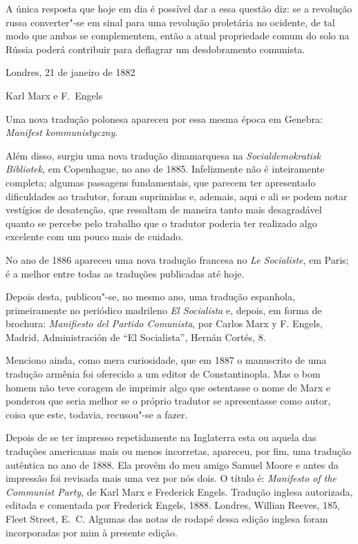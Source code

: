 \begin{hedraquote}
 A única resposta que hoje em dia é possível dar a essa questão diz: se
a revolução russa converter"-se em sinal para uma revolução proletária
no ocidente, de tal modo que ambas se complementem, então a atual
propriedade comum do solo na Rússia poderá contribuir para deflagrar um
desdobramento comunista. 

\hfill Londres, 21 de janeiro de 1882

\hfill Karl Marx e F.~Engels
\end{hedraquote} 

 Uma nova tradução polonesa apareceu por essa mesma época em Genebra:
\textit{Manifest kommunistyczny}.

 Além disso, surgiu uma nova tradução dinamarquesa na
\textit{Socialdemokratisk Bibliotek}, em Copenhague, no ano de 1885.
Infelizmente não é inteiramente completa; algumas passagens
fundamentais, que parecem ter apresentado dificuldades ao tradutor,
foram suprimidas e, ademais, aqui e ali se podem notar vestígios de
desatenção, que ressaltam de maneira tanto mais desagradável quanto se
percebe pelo trabalho que o tradutor poderia ter realizado algo
excelente com um pouco mais de cuidado.

 No ano de 1886 apareceu uma nova tradução francesa no \textit{Le
Socialiste}, em Paris; é a melhor entre todas as traduções publicadas
até hoje.

 Depois desta, publicou"-se, no mesmo ano, uma tradução espanhola,
primeiramente no periódico madrileno \textit{El Socialista} e, depois,
em forma de brochura: \textit{Manifiesto del Partido Comunista}, por
Carlos Marx y F. Engels, Madrid, Administración de “El Socialista”,
Hernán Cortés, 8.

 Menciono ainda, como mera curiosidade, que em 1887 o manuscrito de uma
tradução armênia foi oferecido a um editor de Constantinopla. Mas o bom
homem não teve coragem de imprimir algo que ostentasse o nome de Marx e
ponderou que seria melhor se o próprio tradutor se apresentasse como
autor, coisa que este, todavia, recusou"-se a fazer.

 Depois de se ter impresso\textbf{} repetidamente na Inglaterra esta ou
aquela das traduções americanas mais ou menos incorretas, apareceu, por
fim, uma tradução autêntica no ano de 1888. Ela provém do meu amigo
Samuel Moore e antes da impressão foi revisada mais uma vez por nós
dois. O título é: \textit{Manifesto of the Communist Party}, de Karl
Marx e Frederick Engels. Tradução inglesa autorizada, editada e comentada por Frederick Engels, 1888. Londres, Willian Reeves, 185, Fleet Street, E.~C. Algumas das notas de rodapé dessa edição inglesa foram
incorporadas por mim à presente edição.

